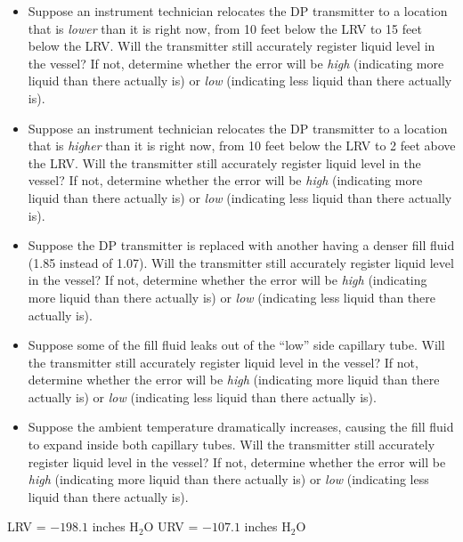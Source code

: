 \begin{itemize}
\item{} Suppose an instrument technician relocates the DP transmitter to a location that is {\it lower} than it is right now, from 10 feet below the LRV to 15 feet below the LRV.  Will the transmitter still accurately register liquid level in the vessel?  If not, determine whether the error will be {\it high} (indicating more liquid than there actually is) or {\it low} (indicating less liquid than there actually is).
\item{} Suppose an instrument technician relocates the DP transmitter to a location that is {\it higher} than it is right now, from 10 feet below the LRV to 2 feet above the LRV.  Will the transmitter still accurately register liquid level in the vessel?  If not, determine whether the error will be {\it high} (indicating more liquid than there actually is) or {\it low} (indicating less liquid than there actually is).
\item{} Suppose the DP transmitter is replaced with another having a denser fill fluid (1.85 instead of 1.07).  Will the transmitter still accurately register liquid level in the vessel?  If not, determine whether the error will be {\it high} (indicating more liquid than there actually is) or {\it low} (indicating less liquid than there actually is).
\item{} Suppose some of the fill fluid leaks out of the ``low'' side capillary tube.  Will the transmitter still accurately register liquid level in the vessel?  If not, determine whether the error will be {\it high} (indicating more liquid than there actually is) or {\it low} (indicating less liquid than there actually is).
\item{} Suppose the ambient temperature dramatically increases, causing the fill fluid to expand inside both capillary tubes.  Will the transmitter still accurately register liquid level in the vessel?  If not, determine whether the error will be {\it high} (indicating more liquid than there actually is) or {\it low} (indicating less liquid than there actually is).
\end{itemize}







LRV = $-198.1$ inches H$_{2}$O \hskip 50pt URV = $-107.1$ inches H$_{2}$O






